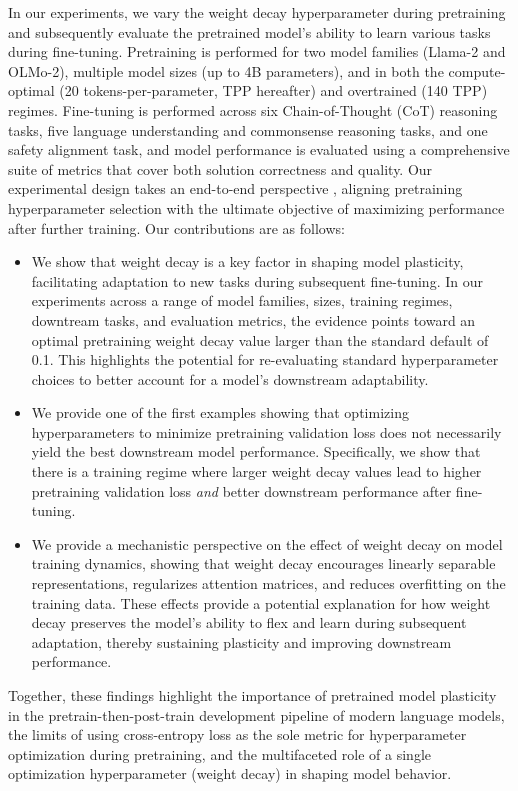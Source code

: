 In our experiments, we vary the weight decay hyperparameter during pretraining and subsequently evaluate the pretrained model’s ability to learn various tasks during fine-tuning. Pretraining is performed for two model families (Llama-2 and OLMo-2), multiple model sizes (up to 4B parameters), and in both the compute-optimal (20 tokens-per-parameter, TPP hereafter) and overtrained (140 TPP) regimes. Fine-tuning is performed across six Chain-of-Thought (CoT) reasoning tasks, five language understanding and commonsense reasoning tasks, and one safety alignment task, and model performance is evaluated using a comprehensive suite of metrics that cover both solution correctness and quality. Our experimental design takes an end-to-end perspective \citep{qi2025evolm,mayilvahanan2025llmsontheline}, aligning pretraining hyperparameter selection with the ultimate objective of maximizing performance after further training.
Our contributions are as follows:

\begin{itemize} 
\item We show that weight decay is a key factor in shaping model plasticity, facilitating adaptation to new tasks during subsequent fine-tuning. In our experiments across a range of model families, sizes, training regimes, downtream tasks, and evaluation metrics, the evidence points toward an optimal pretraining weight decay value larger than the standard default of 0.1. This highlights the potential for re-evaluating standard hyperparameter choices to better account for a model's downstream adaptability.

\item We provide one of the first examples showing that optimizing hyperparameters to minimize pretraining validation loss does not necessarily yield the best downstream model performance. Specifically, we show that there is a training regime where larger weight decay values lead to higher pretraining validation loss {\it and} better downstream performance after fine-tuning.

\item We provide a mechanistic perspective on the effect of weight decay on model training dynamics, showing that weight decay encourages linearly separable representations, regularizes attention matrices, and reduces overfitting on the training data. These effects provide a potential explanation for how weight decay preserves the model's ability to flex and learn during subsequent adaptation, thereby sustaining plasticity and improving downstream performance. 
\end{itemize}


Together, these findings highlight the importance of pretrained model plasticity in the pretrain-then-post-train development pipeline of modern language models, the limits of using cross-entropy loss as the sole metric for hyperparameter optimization during pretraining, and the multifaceted role of a single optimization hyperparameter (weight decay) in shaping model behavior.